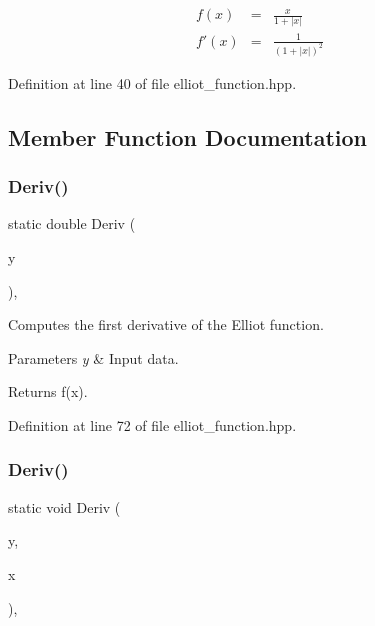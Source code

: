 \begin{eqnarray*} f(x) &=& \frac{x}{1 + |x|} \\ f'(x) &=& \frac{1}{(1 + |x|)^2} \end{eqnarray*} 

Definition at line 40 of file elliot\+\_\+function.\+hpp.



\subsection{Member Function Documentation}
\mbox{\label{classmlpack_1_1ann_1_1ElliotFunction_a163d34fd09f8edf457164f5033c635cf}} 
\subsubsection{Deriv()\hspace{0.1cm}{\footnotesize\ttfamily [1/2]}}
{\footnotesize\ttfamily static double Deriv (\begin{DoxyParamCaption}\item[{const double}]{y }\end{DoxyParamCaption})\hspace{0.3cm}{\ttfamily [inline]}, {\ttfamily [static]}}



Computes the first derivative of the Elliot function. 


\begin{DoxyParams}{Parameters}
{\em y} & Input data. \\
\hline
\end{DoxyParams}
\begin{DoxyReturn}{Returns}
f\textquotesingle{}(x). 
\end{DoxyReturn}


Definition at line 72 of file elliot\+\_\+function.\+hpp.

\mbox{\label{classmlpack_1_1ann_1_1ElliotFunction_ad442502c34b67303b74c735641dab790}} 
\subsubsection{Deriv()\hspace{0.1cm}{\footnotesize\ttfamily [2/2]}}
{\footnotesize\ttfamily static void Deriv (\begin{DoxyParamCaption}\item[{const Input\+Vec\+Type \&}]{y,  }\item[{Output\+Vec\+Type \&}]{x }\end{DoxyParamCaption})\hspace{0.3cm}{\ttfamily [inline]}, {\ttfamily [static]}}



